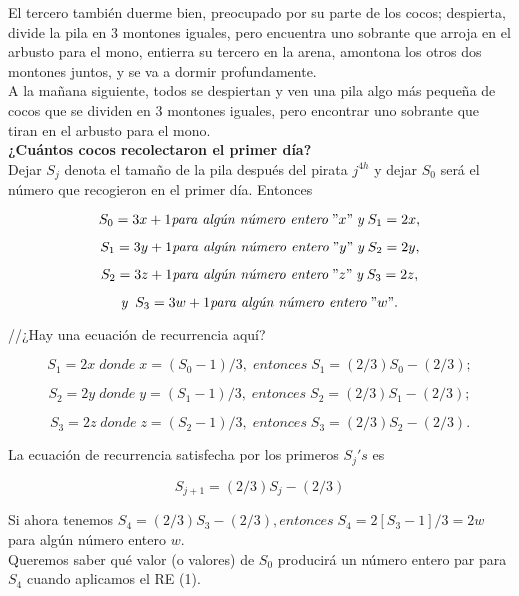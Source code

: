 \documentclass{article}
\begin{document}
El tercero también duerme bien, preocupado por su parte de los cocos; despierta, divide la pila en 3 montones iguales, pero encuentra uno sobrante que arroja en el arbusto para el mono, entierra su tercero en la arena, amontona los otros dos montones juntos, y se va a dormir profundamente.\\

A la mañana siguiente, todos se despiertan y ven una pila algo más pequeña de cocos que se dividen en 3 montones iguales, pero encontrar uno sobrante que tiran en el arbusto para el mono.\\

{\bf ¿Cuántos cocos recolectaron el primer día?}\\

Dejar $S_{j}$ denota el tamaño de la pila después del pirata $j^{4h}$ y dejar $S_{0}$ será el número que recogieron en el primer día. Entonces

$$
S_{0} = 3x+1 \textit{para algún número entero}\; "x" \; \textit{y} \; S_1 = 2x,
$$

$$
S_{1} = 3y+1 \textit{para algún número entero}\; "y" \; \textit{y} \; S_2 = 2y,
$$

$$
S_{2} = 3z+1 \textit{para algún número entero}\; "z" \; \textit{y} \; S_3 = 2z,
$$

$$\textit{y} \;\;
S_{3} = 3w+1 \textit{para algún número entero}\; "w".
$$

//¿Hay una ecuación de recurrencia aquí?

$$
S_{1} = 2x \; \textit{donde}\; x=(S_{0}-1)/3, \; \textit{entonces} \; S_{1} = (2/3)S_0 - (2/3);
$$

$$
S_{2} = 2y \; \textit{donde}\; y=(S_{1}-1)/3, \; \textit{entonces} \; S_{2} = (2/3)S_1 - (2/3);
$$

$$
S_{3} = 2z \; \textit{donde}\; z=(S_{2}-1)/3, \; \textit{entonces} \; S_{3} = (2/3)S_2 - (2/3).
$$

La ecuación de recurrencia satisfecha por los primeros $S_{j}'s$ es

\begin{equation}
    S_{j+1} = (2/3)S_{j} - (2/3)
\end{equation}

Si ahora tenemos $S_{4}=(2/3)S_{3}-(2/3), \textit{entonces} \; S_{4}=2[S_{3}-1]/3 = 2w$ para algún número entero $w$.\\

Queremos saber qué valor (o valores) de $S_0$ producirá un número entero par para $S_4$ cuando aplicamos el RE (1).\\
\end{document}
